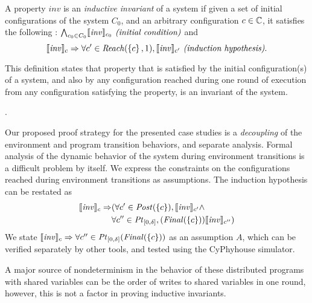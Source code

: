\begin{definition}
\label{def:ii}
A property $\mathit{inv}$ is an \emph{inductive invariant} of a system if given a set of initial configurations of the system $C_0$, and an arbitrary configuration $c\in \mathbb{C}$, it satisfies the following :
$\bigwedge_{c_0\in C_0} \llbracket\mathit{inv}\rrbracket_{c_0}\mbox{\textit{ (initial condition)}}$ and
$$\llbracket\mathit{inv}\rrbracket_{c} \Rightarrow \forall c' \in \mathit{Reach}(\left\{c\right\},1), \llbracket\mathit{inv}\rrbracket_{c'} \mbox{\textit{ (induction hypothesis)}}.$$
\end{definition}
This definition states that property that is satisfied by the initial configuration(s) of a system, and also by any configuration reached during one round of execution from any configuration satisfying the property, is an invariant of the system.



.

Our proposed proof strategy for the presented case studies is a \emph{decoupling} of the environment and program transition behaviors, and separate analysis. Formal analysis of the dynamic behavior of the system during environment transitions is a difficult problem by itself. We express the constraints on the configurations reached during environment transitions as assumptions. The induction hypothesis can be restated as \begin{align*}\llbracket\mathit{inv}\rrbracket_{c} \Rightarrow &(\forall c' \in \mathit{Post}(\left\{c\right\}), \llbracket\mathit{inv}\rrbracket_{c'} \wedge \\ &\forall c'' \in \mathit{Pt}_{[0,\delta]},(\mathit{Final}(\left\{c\right\})) \llbracket\mathit{inv}\rrbracket_{c''})\end{align*} We state $\llbracket\mathit{inv}\rrbracket_{c} \Rightarrow \forall c'' \in \mathit{Pt}_{[0,\delta]}(\mathit{Final}(\left\{c\right\})) $ as an assumption $A$, which can be verified separately by other tools, and tested using the CyPhyhouse simulator.

 A major source of nondeterminism in the behavior of these distributed programs with shared variables can be the order of writes to shared variables in one round, however, this is not a factor in proving inductive invariants.

